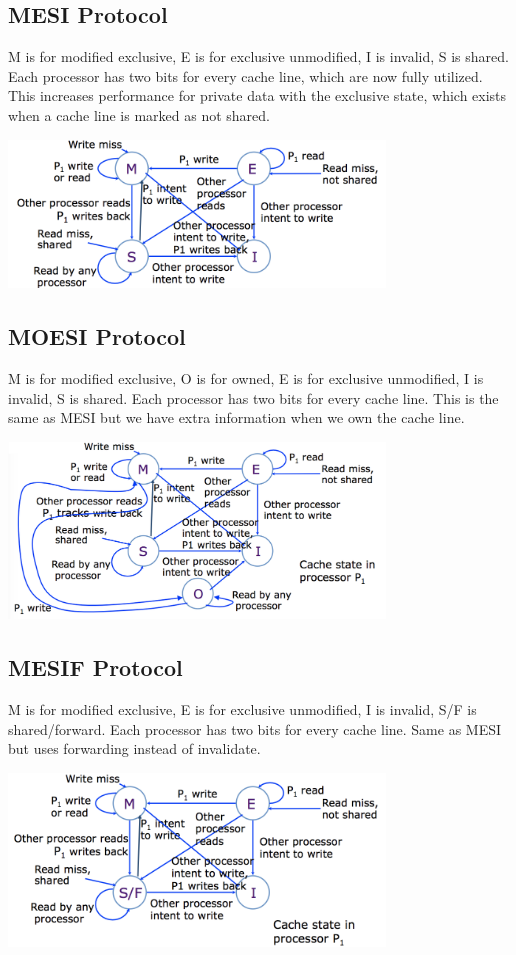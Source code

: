 \documentclass{article}
\begin{document}
\subsection{MESI Protocol}
M is for modified exclusive, E is for exclusive unmodified, I is invalid, S is shared. Each processor has two bits for every cache line, which are now fully utilized. This increases performance for private data with the exclusive state, which exists when a cache line is marked as not shared.
\begin{center}
\includegraphics[width=0.75\textwidth]{mesi}
\end{center}

\subsection{MOESI Protocol}
M is for modified exclusive, O is for owned, E is for exclusive unmodified, I is invalid, S is shared. Each processor has two bits for every cache line. This is the same as MESI but we have extra information when we own the cache line.
\begin{center}
\includegraphics[width=0.75\textwidth]{moesi}
\end{center}

\subsection{MESIF Protocol}
M is for modified exclusive, E is for exclusive unmodified, I is invalid, S/F is shared/forward. Each processor has two bits for every cache line. Same as MESI but uses forwarding instead of invalidate.
\begin{center}
\includegraphics[width=0.75\textwidth]{mesif}
\end{center}
\end{document}
